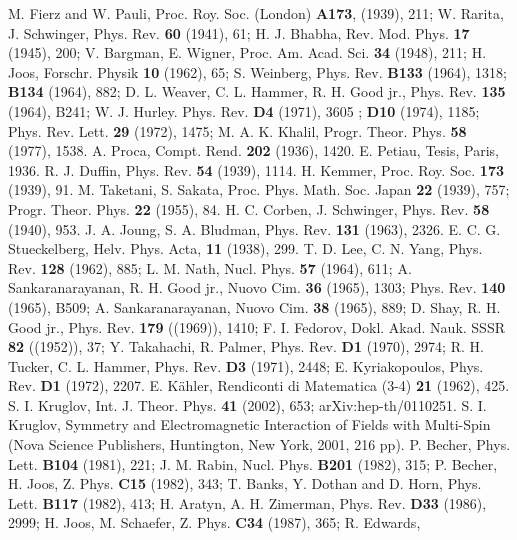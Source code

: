 \documentclass[a4paper,12pt]{article}
\begin{document}
\begin{thebibliography}{99}
  M. Fierz and W. Pauli, Proc. Roy. Soc. (London) \textbf{A173},
(1939), 211; W. Rarita, J. Schwinger, Phys. Rev. \textbf{60}
(1941), 61; H. J. Bhabha, Rev. Mod. Phys. \textbf{17} (1945), 200;
V. Bargman, E. Wigner, Proc. Am. Acad. Sci. \textbf{34} (1948),
211; H. Joos, Forschr. Physik \textbf{10} (1962), 65; S. Weinberg,
Phys. Rev. \textbf{B133} (1964), 1318; \textbf{B134} (1964), 882;
D. L. Weaver, C. L. Hammer, R. H. Good jr., Phys. Rev. \textbf{
135} (1964), B241; W. J. Hurley. Phys. Rev. \textbf{D4} (1971),
3605 ; \textbf{D10} (1974), 1185; Phys. Rev. Lett. \textbf{29}
(1972), 1475; M. A. K. Khalil, Progr. Theor. Phys. \textbf{58}
(1977), 1538.
 A. Proca, Compt. Rend. {\bf 202} (1936), 1420.
 E. Petiau, Tesis, Paris, 1936.
 R. J. Duffin, Phys. Rev. \textbf{54} (1939), 1114.
 H. Kemmer, Proc. Roy. Soc. \textbf{173} (1939), 91.
  M. Taketani, S. Sakata, Proc. Phys. Math. Soc. Japan \textbf{22}
(1939), 757; Progr. Theor. Phys. \textbf{22} (1955), 84.
  H. C. Corben, J. Schwinger, Phys. Rev. \textbf{58} (1940), 953.
  J. A. Joung, S. A. Bludman, Phys. Rev. \textbf{131} (1963), 2326.
 E. C. G. Stueckelberg, Helv. Phys. Acta, \textbf{11} (1938), 299.
  T. D. Lee, C. N. Yang, Phys. Rev. \textbf{128} (1962), 885;
L. M. Nath, Nucl. Phys. \textbf{57} (1964), 611; A.
Sankaranarayanan, R. H. Good jr., Nuovo Cim. \textbf{36} (1965),
1303; Phys. Rev. \textbf{140} (1965), B509; A. Sankaranarayanan,
Nuovo Cim. \textbf{38} (1965), 889; D. Shay, R. H. Good jr., Phys.
Rev. \textbf{179} ((1969)), 1410; F. I. Fedorov, Dokl. Akad. Nauk.
SSSR \textbf{82} ((1952)), 37; Y. Takahachi, R. Palmer, Phys. Rev.
\textbf{D1} (1970), 2974; R. H. Tucker, C. L. Hammer, Phys. Rev.
\textbf{D3} (1971), 2448; E. Kyriakopoulos, Phys. Rev. \textbf{D1}
(1972), 2207.
 E. K\"ahler, Rendiconti di Matematica (3-4)
\textbf{21} (1962), 425.
 S. I. Kruglov, Int. J. Theor. Phys. {\bf 41} (2002),
653; arXiv:hep-th/0110251.
 S. I. Kruglov, Symmetry and Electromagnetic Interaction of Fields
with Multi-Spin (Nova Science Publishers, Huntington, New York,
2001, 216 pp).
  P. Becher,  Phys. Lett. \textbf{B104} (1981),
221; J. M. Rabin,  Nucl. Phys. \textbf{B201} (1982), 315; P.
Becher, H. Joos,  Z. Phys. \textbf{C15} (1982), 343; T. Banks, Y.
Dothan and D. Horn, Phys. Lett. \textbf{B117 } (1982), 413; H.
Aratyn, A. H. Zimerman,  Phys. Rev. \textbf{D33} (1986), 2999; H.
Joos, M. Schaefer,  Z. Phys. \textbf{C34} (1987), 365; R. Edwards,

\end{thebibliography}
\end{document}
